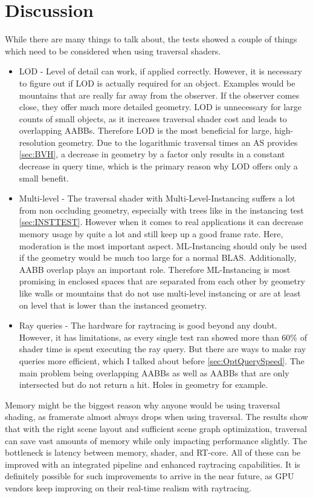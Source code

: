 \section{Discussion}
While there are many things to talk about, the tests showed a couple of things which need to be considered when using traversal shaders.
\begin{itemize}
    \item LOD - Level of detail can work, if applied correctly. However, it is necessary to figure out if LOD is actually required for an object. Examples would be mountains that are really far away from the observer. If the observer comes close, they offer much more detailed geometry. LOD is unnecessary for large counts of small objects, as it increases traversal shader cost and leads to overlapping AABBs. Therefore LOD is the most beneficial for large, high-resolution geometry. Due to the logarithmic traversal times an AS provides \ref{sec:BVH}, a decrease in geometry by a factor only results in a constant decrease in query time, which is the primary reason why LOD offers only a small benefit.
    \item Multi-level - The traversal shader with Multi-Level-Instancing suffers a lot from non occluding geometry, especially with trees like in the instancing test \ref{sec:INSTTEST}. However when it comes to real applications it can decrease memory usage by quite a lot and still keep up a good frame rate. Here, moderation is the most important aspect. ML-Instancing should only be used if the geometry would be much too large for a normal BLAS. Additionally, AABB overlap plays an important role. Therefore ML-Instancing is most promising in enclosed spaces that are separated from each other by geometry like walls or mountains that do not use multi-level instancing or are at least on level that is lower than the instanced geometry.
    \item Ray queries - The hardware for raytracing is good beyond any doubt. However, it has limitations, as every single test ran showed more than 60\% of shader time is spent executing the ray query. But there are ways to make ray queries more efficient, which I talked about before \ref{sec:OptQuerySpeed}. The main problem being overlapping AABBs as well as AABBs that are only intersected but do not return a hit. Holes in geometry for example.
\end{itemize}

Memory might be the biggest reason why anyone would be using traversal shading, as framerate almost always drops when using traversal. The results show that with the right scene layout and sufficient scene graph optimization, traversal can save vast amounts of memory while only impacting performance slightly. The bottleneck is latency between memory, shader, and RT-core. All of these can be improved with an integrated pipeline and enhanced raytracing capabilities. It is definitely possible for such improvements to arrive in the near future, as GPU vendors keep improving on their real-time realism with raytracing.

